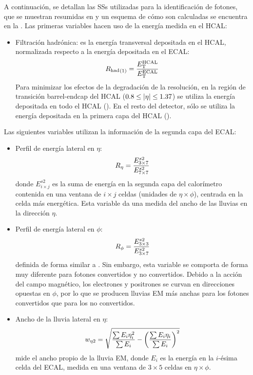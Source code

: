 A continuación, se detallan las \acp{SS} utilizadas para la identificación de fotones, que se muestran resumidas en \Tab{\ref{tab:pid_ss:ss:ss_variables}} y un esquema de c\'omo son calculadas se encuentra en la \Fig{\ref{fig:pid_ss:ss:ss_variables}}.
Las primeras variables hacen uso de la energía medida en el \ac{HCAL}:
\begin{itemize}
    \item Filtraci\'on hadr\'onica: es la energía transversal depositada en el \ac{HCAL}, normalizada respecto a la energía depositada en el \ac{ECAL}:
        \begin{equation}
            {\ensuremath{R_{\text{had}}}}_{(1)} = \frac{E_{\text{T}}^{\text{HCAL}}}{E_{\text{T}}^{\text{ECAL}}}
        \end{equation}
        Para minimizar los efectos de la degradación de la resolución, en la región de transición barrel-endcap del \ac{HCAL} (\(0.8\leq |\eta|\leq 1.37\)) se utiliza la energía depositada en todo el \ac{HCAL} (\rhad). En el resto del detector, sólo se utiliza la energía depositada en la primera capa del \ac{HCAL} (\rhado).
\end{itemize}
Las siguientes variables utilizan la información de la segunda capa del \ac{ECAL}:
\begin{itemize}
    \item Perfil de energía lateral en \(\eta\):
        \begin{equation}
            R_{\eta} = \frac{E_{3\times7}^{s2}}{E_{7\times7}^{s2}}
        \end{equation}
        donde \(E_{i\times j}^{s2}\) es la suma de energía en la segunda capa del calorímetro contenida en una ventana de \(i \times j \) celdas (unidades de \(\eta \times \phi\)), centrada en la celda más energética. Esta variable da una medida del ancho de las lluvias en la dirección \(\eta\).
    \item Perfil de energía lateral en \(\phi\):
        \begin{equation}
            R_{\phi} = \frac{E_{3\times3}^{s2}}{E_{3\times7}^{s2}}
        \end{equation}
        definida de forma similar a \reta. Sin embargo, esta variable se comporta de forma muy diferente para fotones convertidos y no convertidos. Debido a la acción del campo magnético, los electrones y positrones se curvan en direcciones opuestas en \(\phi\), por lo que se producen lluvias \ac{EM} más anchas para los fotones convertidos que para los no convertidos.
    \item Ancho de la lluvia lateral en \(\eta\):
        \begin{equation}
            w_{\eta 2} = \sqrt{
                \frac{\sum E_i \eta_i^2}{\sum E_i}
                -
                \left(\frac{\sum E_i \eta_i}{\sum E_i}\right)^2
            }
        \end{equation}
        mide el ancho propio de la lluvia \ac{EM}, donde \(E_i\) es la energía en la \(i\)-ésima celda del \ac{ECAL}, medida en una ventana de \(3\times 5 \) celdas en \(\eta \times \phi\).
\end{itemize}
